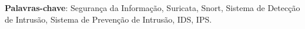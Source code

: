 \documentclass[
	12pt,				
	openright,		
	twoside,	
	a4paper,
	english,	
	brazil	
	]{abntex2}
\begin{document}
\setlength{\absparsep}{18pt} 
\begin{resumo}
 \textbf{Palavras-chave}: Segurança da Informação, Suricata, Snort, Sistema de Detecção de Intrusão, Sistema de Prevenção de Intrusão, IDS, IPS.
\end{resumo}
\end{document}
